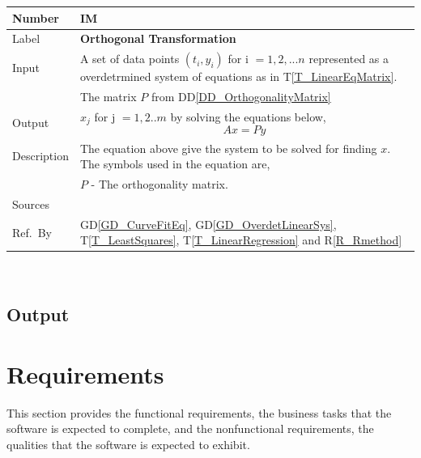 \documentclass[12pt]{article}
\newcommand{\colAwidth}{0.13\textwidth}
\newcommand{\colBwidth}{0.82\textwidth}
\newcommand{\dref}[1]{GD\ref{#1}}
\newcommand{\ddref}[1]{DD\ref{#1}}
\newcommand{\tref}[1]{T\ref{#1}}
\newcounter{instnum} %
\newcommand{\rref}[1]{R\ref{#1}}
\begin{document}
\noindent
\begin{minipage}{\textwidth}
	\renewcommand*{\arraystretch}{1.5}
	\begin{tabular}{| p{\colAwidth} | p{\colBwidth}|}
		\hline
		\rowcolor[gray]{0.9}
		Number& IM{instnum}\theinstnum \label{IM_OrthogonalTransformation}\\
		\hline
		Label& \bf Orthogonal Transformation \\
		\hline
		
		Input
		& A set of data points $(t_i,y_i)$ for i $=1,2,...n$ represented as a overdetrmined system of equations as in \tref{T_LinearEqMatrix}.\\
		& The matrix $P$ from \ddref{DD_OrthogonalityMatrix}\\
		\hline
		
		Output
		& $x_j$ for j $=1,2..m$ by solving the equations below,
		\begin{equation*}
		Ax = Py
		\end{equation*}\\
		\hline
		
		Description & The equation above give the system to be solved for finding $x$. The symbols used in the equation are,\\
		& $P$ - The orthogonality matrix.\\
		\hline
	
		Sources& ~\cite{Health1997}\\
		\hline
		
		Ref.\ By &  \dref{GD_CurveFitEq}, \dref{GD_OverdetLinearSys}, \tref{T_LeastSquares}, \tref{T_LinearRegression} and \rref{R_Rmethod}\\
		\hline
	\end{tabular}
\end{minipage}\\









\subsection{Output} \label{sec_Output}    

\section{Requirements}

This section provides the functional requirements, the business tasks that the
software is expected to complete, and the nonfunctional requirements, the
qualities that the software is expected to exhibit.
\end{document}
